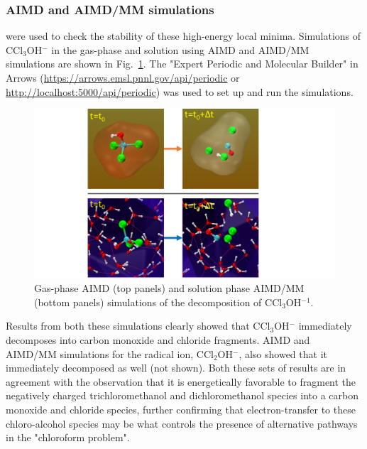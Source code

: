 \documentclass[runningheads,a4paper]{llncs}
\begin{document}
\subsubsection{AIMD and AIMD/MM simulations} were used to check the stability of these high-energy local minima. Simulations of CCl$_3$OH$^-$ in the gas-phase and solution using AIMD and AIMD/MM~\cite{laio2002hamiltonian,cauet2010structure} simulations are shown in Fig.~\ref{fig.enviro.ccl4aimd}.  
The "Expert Periodic and Molecular Builder" in Arrows (\url{https://arrows.emsl.pnnl.gov/api/periodic} or \url{http://localhost:5000/api/periodic}) was used to set up and run the simulations.
\begin{figure}[!h]
   \centering
   \includegraphics[width=1.0\textwidth]{images/ccl3oh-2.pdf}
   \caption{Gas-phase AIMD (top panels) and solution phase AIMD/MM (bottom panels) simulations of the decomposition of CCl$_3$OH$^{-1}$.}
   \label{fig.enviro.ccl4aimd}
\end{figure}
Results from both these simulations clearly showed that CCl$_3$OH$^-$ immediately decomposes into carbon monoxide and chloride fragments.  AIMD and AIMD/MM simulations for the radical ion, CCl$_2$OH$^-$, also showed that it immediately decomposed as well (not shown).  Both these sets of results are in agreement with the observation that it is energetically favorable to fragment the negatively charged trichloromethanol and dichloromethanol species into a carbon monoxide and chloride species, further confirming that electron-transfer to these chloro-alcohol species may be what controls the presence of alternative pathways in the "chloroform problem".
\end{document}

